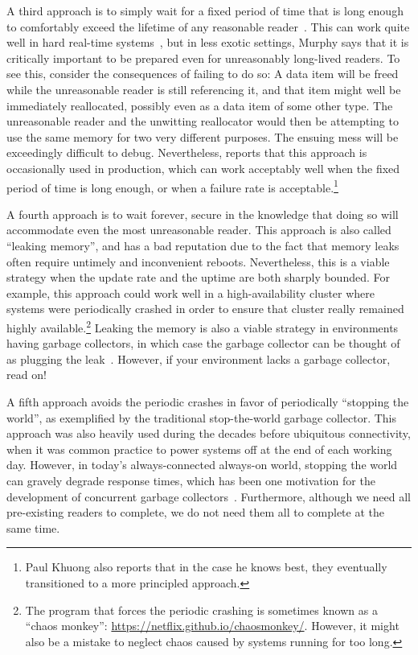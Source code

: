 A third approach is to simply wait for a fixed period of time that is
long enough to comfortably exceed the lifetime of any reasonable
reader~\cite{Jacobson93,AjuJohn95}.
This can work quite well in hard real-time systems~\cite{YuxinRen2018RTRCU},
but in less exotic
settings, Murphy says that it is critically important to be prepared
even for unreasonably long-lived readers.
To see this, consider the consequences of failing to do so:
A data item will be freed while the unreasonable reader is still
referencing it, and that item might well be immediately reallocated,
possibly even as a data item of some other type.
The unreasonable reader and the unwitting reallocator would then
be attempting to use the same memory for two very different purposes.
The ensuing mess will be exceedingly difficult to debug.
Nevertheless,  reports that this approach is
occasionally used in production, which can work acceptably well when the
fixed period of time is long enough, or when a failure rate is
acceptable.\footnote{
	Paul Khuong also reports that in the case he knows best, they
	eventually transitioned to a more principled approach.}

A fourth approach is to wait forever, secure in the knowledge that
doing so will accommodate even the most unreasonable reader.
This approach is also called ``leaking memory'', and has a bad reputation
due to the fact that memory leaks often require untimely and
inconvenient reboots.
Nevertheless, this is a viable strategy when the update rate and the
uptime are both sharply bounded.
For example, this approach could work well in a high-availability
cluster where systems were periodically crashed in order to ensure
that cluster really remained highly available.\footnote{
	The program that forces the periodic crashing is sometimes
	known as a ``chaos monkey'':
	\url{https://netflix.github.io/chaosmonkey/}.
	However, it might also be a mistake to neglect chaos caused
	by systems running for too long.}
Leaking the memory is also a viable strategy in environments having
garbage collectors, in which case the garbage collector can be thought
of as plugging the leak~\cite{Kung80}.
However, if your environment lacks a garbage collector, read on!

A fifth approach avoids the periodic crashes in favor of periodically
``stopping the world'', as exemplified by the traditional stop-the-world
garbage collector.
This approach was also heavily used during the decades before
ubiquitous connectivity, when it was common practice to power systems
off at the end of each working day.
However, in today's always-connected always-on world, stopping the world
can gravely degrade response times, which has been one motivation for the
development of concurrent garbage collectors~\cite{DavidFBacon2003RTGC}.
Furthermore, although we need all pre-existing readers to complete, we do
not need them all to complete at the same time.

